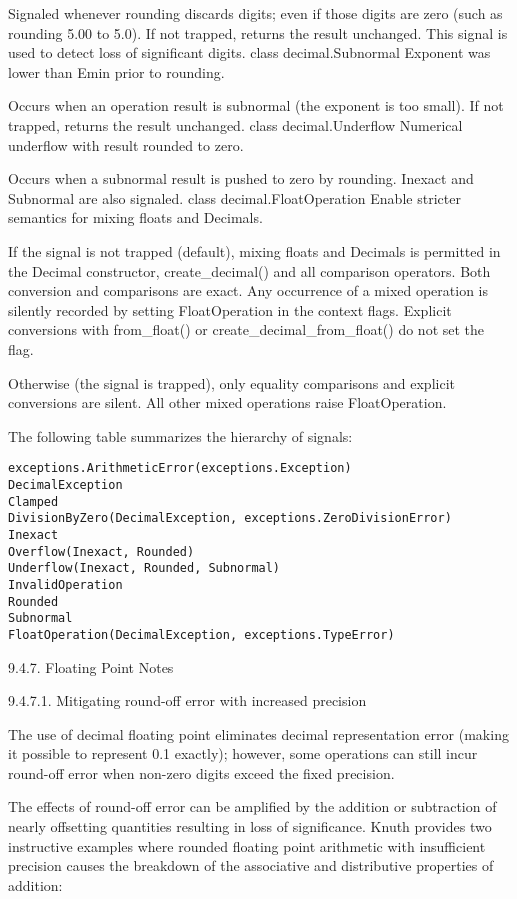 Signaled whenever rounding discards digits; even if those digits are zero (such as rounding 5.00 to 5.0). If not trapped, returns the result unchanged. This signal is used to detect loss of significant digits.
class decimal.Subnormal
Exponent was lower than Emin prior to rounding.

Occurs when an operation result is subnormal (the exponent is too small). If not trapped, returns the result unchanged.
class decimal.Underflow
Numerical underflow with result rounded to zero.

Occurs when a subnormal result is pushed to zero by rounding. Inexact and Subnormal are also signaled.
class decimal.FloatOperation
Enable stricter semantics for mixing floats and Decimals.

If the signal is not trapped (default), mixing floats and Decimals is permitted in the Decimal constructor, create\_decimal() and all comparison operators. Both conversion and comparisons are exact. Any occurrence of a mixed operation is silently recorded by setting FloatOperation in the context flags. Explicit conversions with from\_float() or create\_decimal\_from\_float() do not set the flag.

Otherwise (the signal is trapped), only equality comparisons and explicit conversions are silent. All other mixed operations raise FloatOperation.

The following table summarizes the hierarchy of signals:

\begin{lstlisting}
exceptions.ArithmeticError(exceptions.Exception)
DecimalException
Clamped
DivisionByZero(DecimalException, exceptions.ZeroDivisionError)
Inexact
Overflow(Inexact, Rounded)
Underflow(Inexact, Rounded, Subnormal)
InvalidOperation
Rounded
Subnormal
FloatOperation(DecimalException, exceptions.TypeError)
\end{lstlisting}


9.4.7. Floating Point Notes


9.4.7.1. Mitigating round-off error with increased precision

The use of decimal floating point eliminates decimal representation error (making it possible to represent 0.1 exactly); however, some operations can still incur round-off error when non-zero digits exceed the fixed precision.

The effects of round-off error can be amplified by the addition or subtraction of nearly offsetting quantities resulting in loss of significance. Knuth provides two instructive examples where rounded floating point arithmetic with insufficient precision causes the breakdown of the associative and distributive properties of addition:


